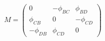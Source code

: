 \begin{equation}
M = \begin{pmatrix}0&-\phi_{BC}&\phi_{BD}\\
\phi_{CB}&0&-\phi_{CD}\\
-\phi_{DB}&\phi_{CD}&0
\end{pmatrix}
\end{equation}

